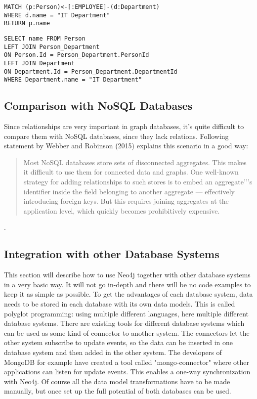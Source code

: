 \begin{lstlisting}[frame=single, caption=Cypher Statement, label=gcystm]
MATCH (p:Person)<-[:EMPLOYEE]-(d:Department)
WHERE d.name = "IT Department"
RETURN p.name
\end{lstlisting}

\begin{lstlisting}[frame=single, caption=SQL Statement, label=gsqlstm]
SELECT name FROM Person
LEFT JOIN Person_Department
ON Person.Id = Person_Department.PersonId
LEFT JOIN Department
ON Department.Id = Person_Department.DepartmentId
WHERE Department.name = "IT Department"
\end{lstlisting}

\subsection{Comparison with NoSQL Databases}

Since relationships are very important in graph databases, it's quite difficult to compare them with NoSQL databases, since they lack relations. Following statement by Webber and Robinson (2015) explains this scenario in a good way:
\begin{quotation}
	Most NoSQL databases store sets of disconnected aggregates. This makes it difficult to use them for connected data and graphs.
	One well-known strategy for adding relationships to such stores is to embed an aggregate'’'s identifier inside the field belonging to another aggregate — effectively introducing foreign keys.
	But this requires joining aggregates at the application level, which quickly becomes prohibitively expensive.
\end{quotation} \cite[p. 15]{WebberRobinson.2015}.

\subsection{Integration with other Database Systems}
This section will describe how to use Neo4j together with other database systems in a very basic way. It will not go in-depth and there will be no code examples to keep it as simple as possible.
To get the advantages of each database system, data needs to be stored in each database with its own data models. This is called polyglot programming: using multiple different languages, here multiple different database systems. There are existing tools for different database systems which can be used as some kind of connector to another system. The connectors let the other system subscribe to update events, so the data can be inserted in one database system and then added in the other system. The developers of MongoDB for example have created a tool called "mongo-connector" where other applications can listen for update events. This enables a one-way synchronization with Neo4j. Of course all the data model transformations have to be made manually, but once set up the full potential of both databases can be used. \cite["Goals", para. 1]{NeoTechnologyInc.2017h}

